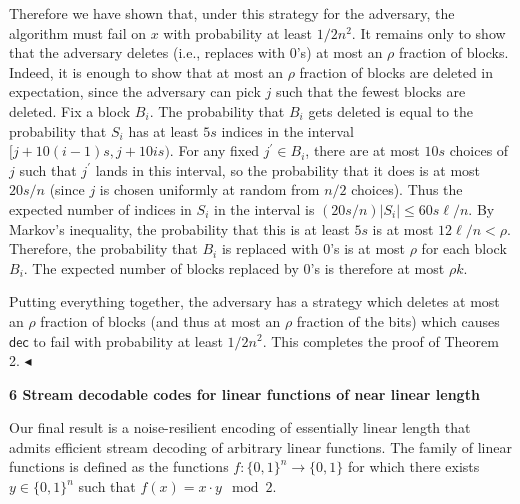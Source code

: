 \documentclass[10pt,a4paper]{article}
\begin{document}
Therefore we have shown that, under this strategy for the adversary, the algorithm must fail on $x$ with probability at least $1/2n^{2}$. It remains only to show that the adversary deletes (i.e., replaces with $0$’s) at most an $\rho$ fraction of blocks. Indeed, it is enough to show that at most an $\rho$ fraction of blocks are deleted in expectation, since the adversary can pick $j$ such that the fewest blocks are deleted. Fix a block $B_{i}$. The probability that $B_{i}$ gets deleted is equal to the probability that $S_{i}$ has at least $5s$ indices in the interval $[j+10(i-1)s,j+10is)$. For any fixed $j^{\prime}\in B_{i}$, there are at most $10s$ choices of $j$ such that $j^{\prime}$ lands in this interval, so the probability that it does is at most $20s/n$ (since $j$ is chosen uniformly at random from $n/2$ choices). Thus the expected number of indices in $S_{i}$ in the interval is $(20s/n)|S_{i}|\leq 60s\ell/n$. By Markov’s inequality, the probability that this is at least $5s$ is at most $12\ell/n<\rho$. Therefore, the probability that $B_{i}$ is replaced with $0$’s is at most $\rho$ for each block $B_{i}$. The expected number of blocks replaced by $0$’s is therefore at most $\rho k$.\par




Putting everything together, the adversary has a strategy which deletes at most an $\rho$ fraction of blocks (and thus at most an $\rho$ fraction of the bits) which causes $\mathsf{dec}$ to fail with probability at least $1/2n^{2}$. This completes the proof of Theorem 2.
$\blacktriangleleft$\par







\par\medskip\noindent\textbf{
6 Stream decodable codes for linear functions of near linear length}\par




Our final result is a noise-resilient encoding of essentially linear length that admits efficient stream decoding of arbitrary linear functions. The family of linear functions is defined as the functions $f:\{0,1\}^{n}\to\{0,1\}$ for which there exists $y\in\{0,1\}^{n}$ such that $f(x)=x\cdot y\mod 2$.\par




\end{document}

